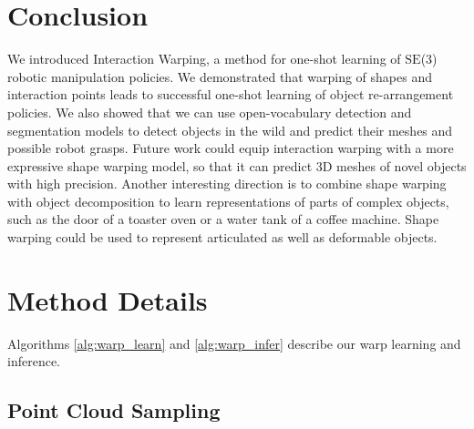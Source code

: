 \documentclass{article}
\newcommand{\evdp}[1]{\textcolor{blue}{[\textbf{EvdP:} #1]}}
\begin{document}
\section{Conclusion}

We introduced Interaction Warping, a method for one-shot learning of $\mathrm{SE}$(3) robotic manipulation policies. We demonstrated that warping of shapes and interaction points leads to successful one-shot learning of object re-arrangement policies. We also showed that we can use open-vocabulary detection and segmentation models to detect objects in the wild and predict their meshes and possible robot grasps. Future work could equip interaction warping with a more expressive shape warping model, so that it can predict 3D meshes of novel objects with high precision. Another interesting direction is to combine shape warping with object decomposition \cite{tenorth13decomposing,vahrenkamp16partbased,chen22neural} to learn representations of parts of complex objects, such as the door of a toaster oven or a water tank of a coffee machine. Shape warping could be used to represent articulated as well as deformable objects.


\clearpage



\clearpage
\appendix

\section{Method Details}
\label{appendix:method}

Algorithms \ref{alg:warp_learn} and \ref{alg:warp_infer} describe our warp learning and inference.




\subsection{Point Cloud Sampling}
\label{appendix:method:sampling}
\end{document}
